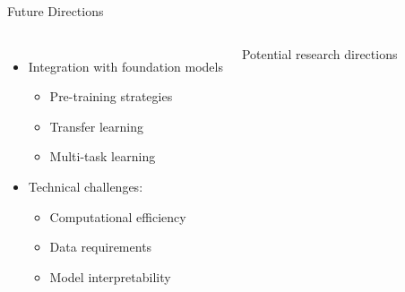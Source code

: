 \documentclass[aspectratio=169]{beamer}
\begin{document}
\begin{frame}{Future Directions}
    \begin{columns}
        \begin{itemize}
            \item Integration with foundation models
            \begin{itemize}
                \item Pre-training strategies
                \item Transfer learning
                \item Multi-task learning
            \end{itemize}
            \item Technical challenges:
            \begin{itemize}
                \item Computational efficiency
                \item Data requirements
                \item Model interpretability
            \end{itemize}
        \end{itemize}
        Potential research directions
    \end{columns}
\end{frame}
\end{document}

